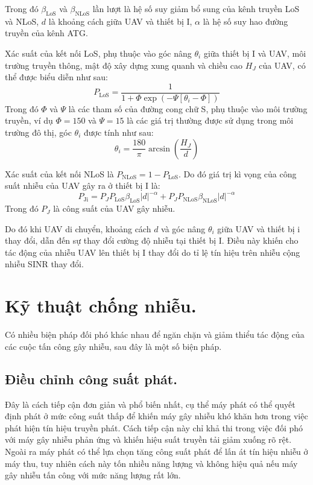 \documentclass{uetgraduation}
\begin{document}
Trong đó $\beta_\text{LoS}$ và $\beta_\text{NLoS}$ lần lượt là hệ số suy giảm bổ sung của kênh truyền LoS và NLoS, $d$ là khoảng cách giữa UAV và thiết bị I,
$\alpha$ là hệ số suy hao đường truyền của kênh ATG. 

Xác suất của kết nối LoS, phụ thuộc vào góc nâng $\theta_i$ giữa thiết bị I và UAV, môi trường truyền thông, mật độ xây dựng xung quanh và chiều cao $H_J$ của UAV,
có thể được biểu diễn như sau:
\[
P_\text{LoS} = \frac{1}{1 + \Phi \exp(-\Psi [\theta_i - \Phi])}
\]
Trong đó $\Phi$ và $\Psi$ là các tham số của đường cong chữ S, phụ thuộc vào môi trường truyền, ví dụ $\Phi = 150$ và $\Psi =15$ là các giá trị thường được sử dụng trong
môi trường đô thị, góc $\theta_i$ được tính như sau:
\[
\theta_i = \frac{180}{\pi} \arcsin(\frac{H_J}{d})
\]

Xác suất của kết nối NLoS là $P_\text{NLoS} = 1 - P_\text{LoS}$. Do đó giá trị kì vọng của công suất nhiễu của UAV gây ra ở thiết bị I là:
\[
P_\text{Ji} = P_J P_\text{LoS} \beta_\text{LoS} |d|^{-\alpha} + P_J P_\text{NLoS} \beta_\text{NLoS} |d|^{-\alpha}
\]
Trong đó $P_J$ là công suất của UAV gây nhiễu.

Do đó khi UAV di chuyển, khoảng cách $d$ và góc nâng $\theta_i$ giữa UAV và thiết bị i thay đổi, dẫn đến sự thay đổi cường độ nhiễu tại thiết bị I.
Điều này khiến cho tác động của nhiễu UAV lên thiết bị I thay đổi do tỉ lệ tín hiệu trên nhiễu cộng nhiễu SINR thay đổi.


\section{Kỹ thuật chống nhiễu.}
Có nhiều biện pháp đối phó khác nhau để ngăn chặn và giảm thiểu tác động của các cuộc tấn công gây nhiễu, sau đây là một số biện pháp.

\subsection{Điều chỉnh công suất phát.}
Đây là cách tiếp cận đơn giản và phổ biến nhất, cụ thể máy phát có thể quyết định phát ở mức công suất thấp để khiến máy gây nhiễu khó khăn hơn trong việc phát hiện
tín hiệu truyền phát. Cách tiếp cận này chỉ khả thi trong việc đối phó với máy gây nhiễu phản ứng và khiến hiệu suất truyền tải giảm xuống rõ rệt. Ngoài ra máy phát
có thể lựa chọn tăng công suất phát để lấn át tín hiệu nhiễu ở máy thu, tuy nhiên cách này tốn nhiều năng lượng và không hiệu quả nếu máy gây nhiễu tấn công với mức
năng lượng rất lớn.
\end{document}
